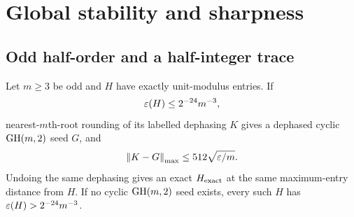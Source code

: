 \section{Global stability and sharpness}\label{sec:global}
\subsection{Odd half-order and a half-integer trace}
\begin{theorem}\label{thm:odd}
Let $m\ge3$ be odd and $H$ have exactly unit-modulus entries. If
\begin{equation}\label{eq:global-threshold}
 \varepsilon(H)\le2^{-24}m^{-3},
\end{equation}
nearest-$m$th-root rounding of its labelled dephasing $K$ gives a dephased cyclic $\operatorname{GH}(m,2)$ seed $G$, and
\begin{equation}\label{eq:odd-distance}
 \left\lVert K-G\right\rVert_{\mathrm{max}}\le512\sqrt{\varepsilon/m}.
\end{equation}
Undoing the same dephasing gives an exact $H_{\rm exact}$ at the same maximum-entry distance from $H$. If no cyclic $\operatorname{GH}(m,2)$ seed exists, every such $H$ has $\varepsilon(H)>2^{-24}m^{-3}$.
\end{theorem}
